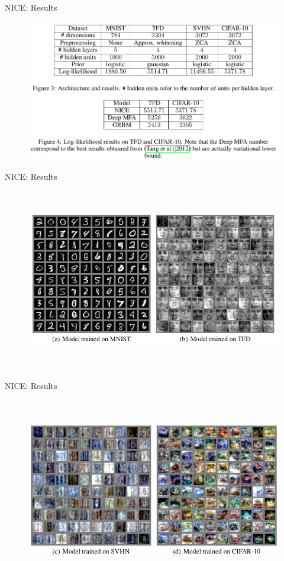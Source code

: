 \begin{frame}{NICE: Results}
    \begin{figure}
        \centering
        \includegraphics[width=\textwidth]{images/nice_experiments.png}
        \label{fig:nice_params_results}
    \end{figure}
\end{frame}
\begin{frame}{NICE: Results}
    \begin{figure}
        \centering
        \includegraphics[width=\textwidth, height = 8cm, keepaspectratio]{images/nice_sampling_1.png}
        \label{fig:nice_sampling}
    \end{figure}
\end{frame}
\begin{frame}{NICE: Results}
    \begin{figure}
        \centering
        \includegraphics[width=\textwidth, height = 8cm, keepaspectratio]{images/nice_sampling_2.png}
        \label{fig:nice_sampling}
    \end{figure}
\end{frame}

